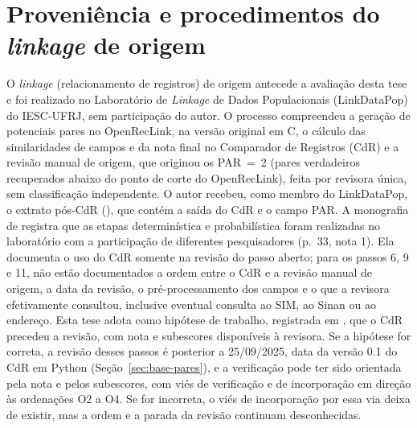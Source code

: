\chapter{Proveniência e procedimentos do \textit{linkage} de origem}\label{ap:linkage-origem}

O \textit{linkage} (relacionamento de registros) de origem antecede a avaliação desta tese e foi realizado no Laboratório de \textit{Linkage} de Dados Populacionais (LinkDataPop) do IESC-UFRJ, sem participação do autor. O processo compreendeu a geração de potenciais pares no OpenRecLink, na versão original em C, o cálculo das similaridades de campos e da nota final no Comparador de Registros (CdR) e a revisão manual de origem, que originou os PAR~=~2 (pares verdadeiros recuperados abaixo do ponto de corte do OpenRecLink), feita por revisora única, sem classificação independente. O autor recebeu, como membro do LinkDataPop, o extrato pós-CdR (), que contém a saída do CdR e o campo PAR. A monografia de  registra que as etapas determinística e probabilística foram realizadas no laboratório com a participação de diferentes pesquisadores (p.~33, nota 1). Ela documenta o uso do CdR somente na revisão do passo aberto; para os passos 6, 9 e 11, não estão documentados a ordem entre o CdR e a revisão manual de origem, a data da revisão, o pré-processamento dos campos e o que a revisora efetivamente consultou, inclusive eventual consulta ao SIM, ao Sinan ou ao endereço. Esta tese adota como hipótese de trabalho, registrada em , que o CdR precedeu a revisão, com nota e subescores disponíveis à revisora. Se a hipótese for correta, a revisão desses passos é posterior a 25/09/2025, data da versão 0.1 do CdR em Python (Seção~\ref{sec:base-pares}), e a verificação pode ter sido orientada pela nota e pelos subescores, com viés de verificação e de incorporação em direção às ordenações O2 a O4. Se for incorreta, o viés de incorporação por essa via deixa de existir, mas a ordem e a parada da revisão continuam desconhecidas.

